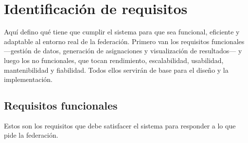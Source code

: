 \documentclass[11pt,a4paper,spanish]{book}
\numberwithin{equation}{chapter}
\numberwithin{figure}{chapter}
\numberwithin{table}{chapter}
\begin{document}
\chapter{Identificación de requisitos}

Aquí defino qué tiene que cumplir el sistema para que sea funcional, eficiente y adaptable al entorno real de la federación. Primero van los requisitos funcionales —gestión de datos, generación de asignaciones y visualización de resultados— y luego los no funcionales, que tocan rendimiento, escalabilidad, usabilidad, mantenibilidad y fiabilidad. Todos ellos servirán de base para el diseño y la implementación.

\section{Requisitos funcionales}

Estos son los requisitos que debe satisfacer el sistema para responder a lo que pide la federación.
\end{document}
